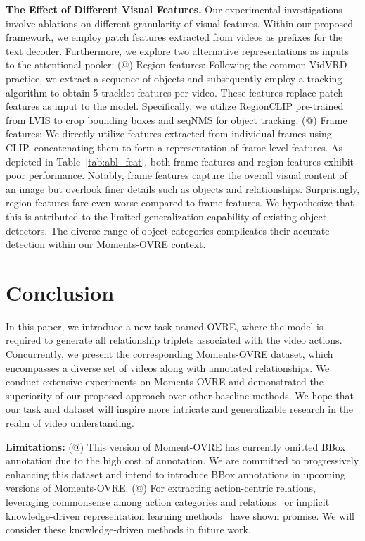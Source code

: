 \documentclass[letterpaper]{article}
\makeatletter
\newcommand{\Rmnum}[1]{\expandafter\@slowromancap\romannumeral #1@}
\makeatother
\begin{document}
\noindent \textbf{The Effect of Different Visual Features.}
Our experimental investigations involve ablations on different granularity of visual features. Within our proposed framework, we employ patch features extracted from videos as prefixes for the text decoder. Furthermore, we explore two alternative representations as inputs to the attentional pooler:
(\Rmnum{1}) Region features: Following the common VidVRD practice, we extract a sequence of objects and subsequently employ a tracking algorithm to obtain 5 tracklet features per video. These features replace patch features as input to the model. Specifically, we utilize RegionCLIP \cite{zhong2021regionclip} pre-trained from LVIS to crop bounding boxes and seqNMS \cite{han2016seqnms} for object tracking.
(\Rmnum{2}) Frame features: We directly utilize features extracted from individual frames using CLIP, concatenating them to form a representation of frame-level features.
As depicted in Table~\ref{tab:abl_feat}, both frame features and region features exhibit poor performance. Notably, frame features capture the overall visual content of an image but overlook finer details such as objects and relationships. Surprisingly, region features fare even worse compared to frame features. We hypothesize that this is attributed to the limited generalization capability of existing object detectors. The diverse range of object categories complicates their accurate detection within our Moments-OVRE context.



\section{Conclusion}
In this paper, we introduce a new task named OVRE, where the model is required to generate all relationship triplets associated with the video actions. Concurrently, we present the corresponding Moments-OVRE dataset, which encompasses a diverse set of videos along with annotated relationships. We conduct extensive experiments on Moments-OVRE and demonstrated the superiority of our proposed approach over other baseline methods. We hope that our task and dataset will inspire more intricate and generalizable research in the realm of video understanding.

\hspace*{\fill}

\noindent \textbf{Limitations:}
(\Rmnum{1}) This version of Moment-OVRE has currently omitted BBox annotation due to the high cost of annotation. We are committed to progressively enhancing this dataset and intend to introduce BBox annotations in upcoming versions of Moments-OVRE.
(\Rmnum{2}) For extracting action-centric relations, leveraging commonsense among action categories and relations~\cite{yang2018commonsense} or implicit knowledge-driven representation learning methods~\cite{li2023knowledge, li2018deep} have shown promise. We will consider these knowledge-driven methods in future work.
\end{document}
